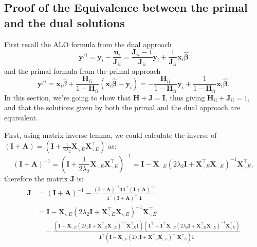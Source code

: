 \documentclass[11pt]{article}
\newcommand{\bu}{\bm{u}}
\newcommand{\bx}{\bm{x}}
\newcommand{\by}{\bm{y}}
\newcommand{\bA}{\bm{A}}
\newcommand{\bH}{\bm{H}}
\newcommand{\bI}{\bm{I}}
\newcommand{\bJ}{\bm{J}}
\newcommand{\bX}{\bm{X}}
\newcommand{\bbeta}{\bm{\beta}}
\newcommand{\bOne}{\bm{1}}
\begin{document}
\subsection{Proof of the Equivalence between the primal and the dual solutions}
First recall the ALO formula from the dual approach \[\by^{/i} = \by_{i}-\frac{\bu_{i}}{\bJ_{ii}} = \frac{\bJ_{ii}-1}{\bJ_{ii}}\by_{i}+\frac{1}{\bJ_{ii}}\bx_{i}\hat{\bbeta}\] and the primal formula from the primal approach \[\by^{/i} = \bx_{i}\hat{\beta} + \frac{\bH_{ii}}{1-\bH_{ii}}(\bx_{i}\hat{\bbeta}-\by_{i}) = -\frac{\bH_{ii}}{1-\bH_{ii}}\by_{i}+\frac{1}{1-\bH_{ii}}\bx_{i}\hat{\bbeta}.\] In this section, we're going to show that $\bH+\bJ =\bI$, thus giving $\bH_{ii}+\bJ_{ii} = 1$, and that the solutions given by both the primal and the dual approach are equivalent.

First, using matrix inverse lemma, we could calculate the inverse of $(\bI+\bA) = (\bI+\frac{1}{2\lambda_{2}}\bX_{\cdot, E}\bX_{\cdot, E}^{\top})$ as: \[(\bI+\bA)^{-1}= (\bI+\frac{1}{2\lambda_{2}}\bX_{\cdot, E}\bX_{\cdot, E}^{\top})^{-1}= \bI - \bX_{\cdot, E}(2\lambda_{2}\bI+\bX_{\cdot, E}^{\top}\bX_{\cdot, E})^{-1}\bX_{\cdot, E}^{\top},\] 
therefore the matrix $\bJ$ is:
\begin{align*}
\bJ &= (\bI+\bA)^{-1} -\frac{(\bI+\bA)^{-1}\bOne\bOne^{\top}(\bI+\bA)^{-1}}{\bOne^{\top}(\bI+\bA)^{-1}\bOne}\\
&= \bI - \bX_{\cdot, E}(2\lambda_{2}\bI+\bX_{\cdot, E}^{\top}\bX_{\cdot, E})^{-1}\bX_{\cdot, E}^{\top}\\
&\quad- \frac{(\bOne-\bX_{\cdot, E}(2\lambda_{2}\bI+\bX_{\cdot, E}^{\top}\bX_{\cdot, E})^{-1}\bX_{\cdot, E}^{\top}\bOne)(\bOne^{\top}-\bOne^{\top}\bX_{\cdot, E}(2\lambda_{2}\bI+\bX_{\cdot, E}^{\top}\bX_{\cdot, E})^{-1}\bX_{\cdot, E}^{\top})}{\bOne^{\top}(\bI-\bX_{\cdot, E}(2\lambda_{2}\bI+\bX_{\cdot, E}^{\top}\bX_{\cdot, E})^{-1}\bX_{\cdot, E}^{\top})\bOne}
\end{align*}
\end{document}
